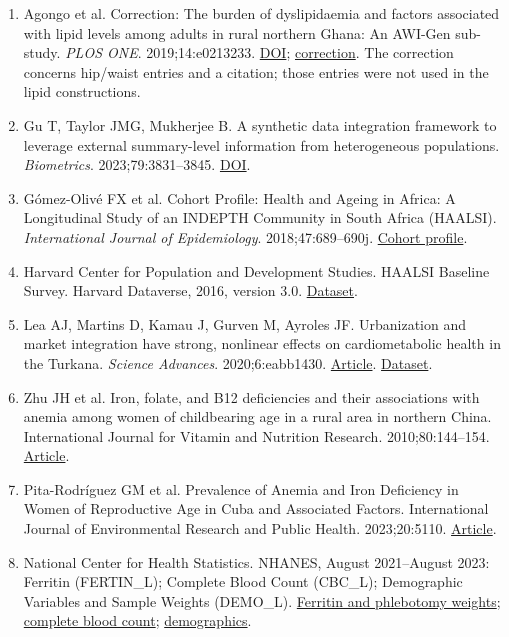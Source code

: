 \documentclass[sigconf,review]{acmart}
\begin{document}
\begin{enumerate}
\item Agongo et al. Correction: The burden of dyslipidaemia and factors associated with lipid levels among adults in rural northern Ghana: An AWI-Gen sub-study. \emph{PLOS ONE}. 2019;14:e0213233. \href{https://doi.org/10.1371/journal.pone.0213233}{DOI}; \href{https://pmc.ncbi.nlm.nih.gov/articles/PMC6392312/}{correction}. The correction concerns hip/\allowbreak{}waist entries and a citation; those entries were not used in the lipid constructions.

\item Gu T, Taylor JMG, Mukherjee B. A synthetic data integration framework to leverage external summary-level information from heterogeneous populations. \emph{Biometrics}. 2023;79:3831–\allowbreak{}3845. \href{https://doi.org/10.1111/biom.13852}{DOI}.

\item Gómez-Olivé FX et al. Cohort Profile: Health and Ageing in Africa: A Longitudinal Study of an INDEPTH Community in South Africa (HAALSI). \emph{International Journal of Epidemiology}. 2018;47:689–\allowbreak{}690j. \href{https://doi.org/10.1093/ije/dyx247}{Cohort profile}.

\item Harvard Center for Population and Development Studies. HAALSI Baseline Survey. Harvard Dataverse, 2016, version 3.0. \href{https://doi.org/10.7910/DVN/F5YHML}{Dataset}.

\item Lea AJ, Martins D, Kamau J, Gurven M, Ayroles JF. Urbanization and market integration have strong, nonlinear effects on cardiometabolic health in the Turkana. \emph{Science Advances}. 2020;6:eabb1430. \href{https://doi.org/10.1126/sciadv.abb1430}{Article}. \href{https://doi.org/10.5061/dryad.2z34tmpjk}{Dataset}.

\item Zhu JH et al. Iron, folate, and B12 deficiencies and their associations with anemia among women of childbearing age in a rural area in northern China. International Journal for Vitamin and Nutrition Research. 2010;80:144–\allowbreak{}154. \href{https://doi.org/10.1024/0300-9831/a000014}{Article}.

\item Pita-Rodríguez GM et al. Prevalence of Anemia and Iron Deficiency in Women of Reproductive Age in Cuba and Associated Factors. International Journal of Environmental Research and Public Health. 2023;20:5110. \href{https://doi.org/10.3390/ijerph20065110}{Article}.

\item National Center for Health Statistics. NHANES, August 2021–\allowbreak{}August 2023: Ferritin (FERTIN\_L); Complete Blood Count (CBC\_L); Demographic Variables and Sample Weights (DEMO\_L). \href{https://wwwn.cdc.gov/Nchs/Data/Nhanes/Public/2021/DataFiles/FERTIN\_L.htm}{Ferritin and phlebotomy weights}; \href{https://wwwn.cdc.gov/Nchs/Data/Nhanes/Public/2021/DataFiles/CBC\_L.htm}{complete blood count}; \href{https://wwwn.cdc.gov/Nchs/Data/Nhanes/Public/2021/DataFiles/DEMO\_L.htm}{demographics}.

\end{enumerate}
\end{document}
